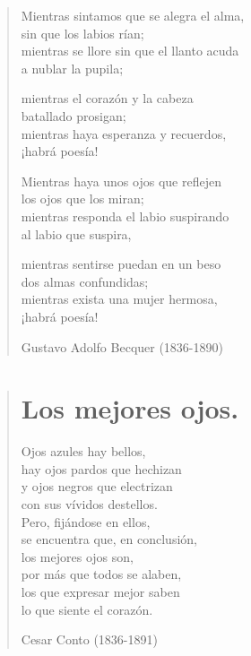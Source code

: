 \documentclass[12pt, twoside]{book}
\begin{document}
\begin{verse}
Mientras sintamos que se alegra el alma,\\
sin que los labios rían;\\
mientras se llore sin que el llanto acuda\\
a nublar la pupila;
\newpage

mientras el corazón y la cabeza\\
batallado prosigan;\\
mientras haya esperanza y recuerdos,\\
¡habrá poesía!

Mientras haya unos ojos que reflejen\\
los ojos que los miran;\\
mientras responda el labio suspirando\\
al labio que suspira,
\newline

mientras sentirse puedan en un beso\\
dos almas confundidas;\\
mientras exista una mujer hermosa,\\
¡habrá poesía!
\newline

Gustavo Adolfo Becquer (1836-1890)
\end{verse}

\newpage
\begin{verse}
\begin{center}
\section{Los mejores ojos.}
\end{center}
Ojos azules hay bellos,\\
hay ojos pardos que hechizan\\
y ojos negros que electrizan\\
con sus vívidos destellos.\\
Pero, fijándose en ellos,\\
se encuentra que, en conclusión,\\
los mejores ojos son,\\
por más que todos se alaben,\\
los que expresar mejor saben\\
lo que siente el corazón.
\newline

Cesar Conto (1836-1891)
\end{verse}
\end{document}

